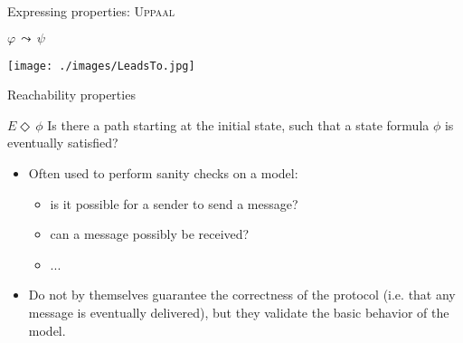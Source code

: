 \documentclass{beamer}
\def\dgold#1{{\darkgoldenrod #1}}
\def\dkb#1{{\blue #1}}
\begin{document}
\begin{slide}{Expressing properties: \textsc{Uppaal}}
\small

\begin{block}{$\varphi\, \leadsto\, \psi$}
\begin{center}
 \texttt{[image: ./images/LeadsTo.jpg]} 
 \end{center}
\end{block}

\end{slide}

\begin{slide}{Reachability properties}
\small

\begin{block}{$E \Diamond\, \phi$}
\dkb{Is there a path starting at the initial state, such that a state formula $\phi$ is eventually satisfied?}

\begin{itemize}
\item  Often used to perform sanity checks  on a model:
\begin{itemize}
\item \dgold{is it possible for a sender to send a message?}
 \item \dgold{can a message possibly be received?}
 \item ...
 \end{itemize}
 \item  Do not by themselves guarantee the correctness of the protocol (i.e. \dgold{that any message is eventually delivered}), 
but they validate the basic behavior of the model.
 \end{itemize}
\end{block}

\end{slide}
\end{document}
